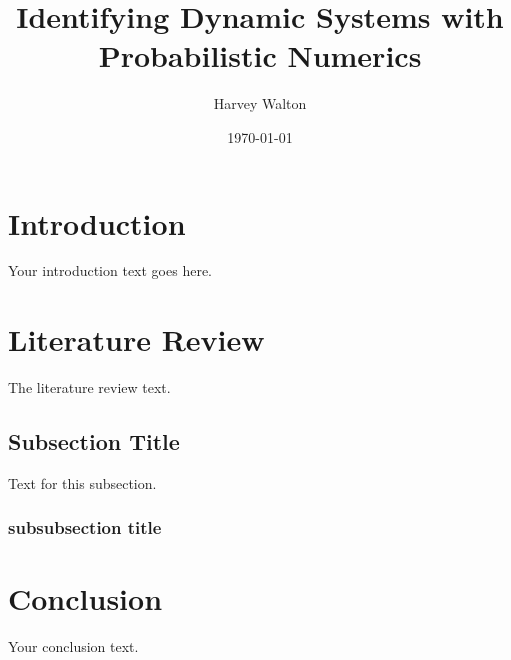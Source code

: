 \documentclass[12pt]{article}
\title{Identifying Dynamic Systems with Probabilistic Numerics}
\author{Harvey Walton}
\date{\today}
\begin{document}
    \maketitle

    \section{Introduction}
    Your introduction text goes here.

    \section{Literature Review}
    The literature review text.

    \subsection{Subsection Title}
    Text for this subsection.

    \subsubsection{subsubsection title}


    \section{Conclusion}
    Your conclusion text.

    \printbibliography
\end{document}
